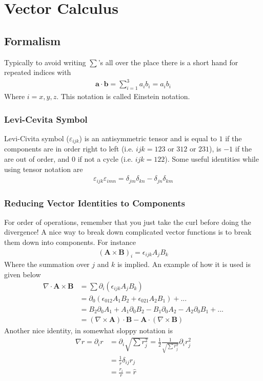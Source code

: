 \chapter{Vector Calculus}

\section{Formalism}
Typically to avoid writing $\sum$'s all over the place there is a short hand for repeated indices with
\begin{align}\label{einstein_notation}
\textbf{a}\cdot\textbf{b} = \sum_{i=1}^3 a_ib_i = a_ib_i
\end{align}
Where $i = x,y,z$. This notation is called Einstein notation.


\subsection{Levi-Cevita Symbol}
 Levi-Civita symbol ($\varepsilon_{ijk}$)  is an antisymmetric tensor and is equal to $1$ if the components are in order right to left (i.e. $ijk = 123$ or $312$ or $231$), is $-1$ if the are out of order, and 0 if not a cycle (i.e. $ijk = 122$). Some useful identities while using tensor notation are
 \begin{align}
 \varepsilon_{ijk}\varepsilon_{imn} = \delta_{jm}\delta_{kn} - \delta_{jn}\delta_{km}
 \end{align}


\subsection{Reducing Vector Identities to Components}
For order of operations, remember that you just take the curl before doing the divergence! A nice way to break down complicated vector functions is to break them down into components. For instance
\begin{align}
(\textbf{A} \times \textbf{B})_i = \epsilon_{ijk}A_jB_k
\end{align}
Where the summation over $j$ and $k$ is implied. An example of how it is used is given below
\begin{align}
\nabla\cdot\textbf{A}\times\textbf{B} &= \sum \partial_i(\epsilon_{ijk}A_jB_k) \\
&= \partial_0(\epsilon_{012}A_1B_2 + \epsilon_{021}A_2B_1) + ...\\
&= B_2\partial_0A_1 + A_1\partial_0B_2 - B_1\partial_0A_2 - A_2\partial_0B_1 + ...\\
&= (\nabla\times\textbf{A})\cdot\textbf{B} - \textbf{A}\cdot(\nabla\times\textbf{B})
\end{align}
Another nice identity, in somewhat sloppy notation is
\begin{align}
	\nabla r = \partial_i r &= \partial_i \sqrt{\sum r_j^2} = \frac{1}{2}\frac{1}{\sqrt{\sum r_j^2}}\partial_ir_j^2\\
	&= \frac{1}{r}\delta_{ij} r_j\\
	&= \frac{r_i}{r} = \hat{r}
\end{align}




